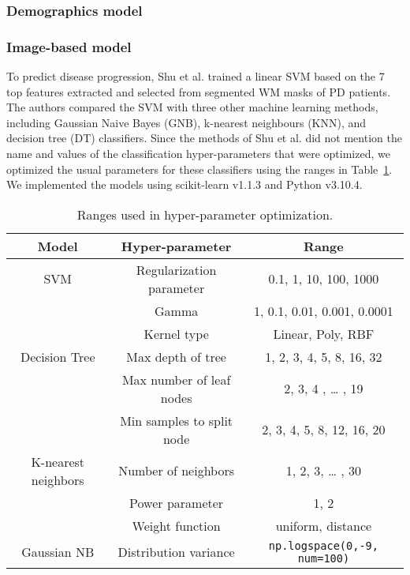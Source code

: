 \subsubsection*{Demographics model}

\subsubsection*{Image-based model}
To predict disease progression, Shu et al. trained a linear SVM based on the 7 top features extracted and selected from segmented WM masks of PD patients. The authors compared the SVM with three other machine learning methods, including Gaussian Naive Bayes (GNB), k-nearest neighbours (KNN), and decision tree (DT) classifiers. Since the methods of Shu et al. did not mention the name and values of the classification hyper-parameters that were optimized, we optimized the usual parameters for these classifiers using the ranges in Table~\ref{table:hyperParamTable}. We implemented the models using scikit-learn v1.1.3 and Python v3.10.4.

\begin{table}[h]
\centering
\begin{tabular}{|c|c|c|}
    \hline
    \textbf{Model} & \textbf{Hyper-parameter} & \textbf{Range} \\
    \hline
    SVM & 
    Regularization parameter & 0.1, 1, 10, 100, 1000 \\
    & Gamma & 1, 0.1, 0.01, 0.001, 0.0001 \\
    & Kernel type & Linear, Poly, RBF \\
    \hline
    Decision Tree & 
    Max depth of tree & 1, 2, 3, 4, 5, 8, 16, 32 \\
    & Max number of leaf nodes & 2, 3, 4 , … , 19 \\
    & Min samples to split node & 2, 3, 4, 5, 8, 12, 16, 20 \\
    \hline
    K-nearest neighbors & 
    Number of neighbors & 1, 2, 3, … , 30 \\
    & Power parameter & 1, 2 \\
    & Weight function & uniform, distance \\
    \hline
    Gaussian NB & 
    Distribution variance & \verb|np.logspace(0,-9, num=100)| \\
    \hline
\end{tabular}
\caption{Ranges used in hyper-parameter optimization.}
\label{table:hyperParamTable}
\end{table}
